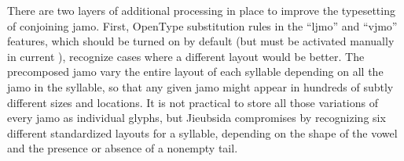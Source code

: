 \documentclass[14pt]{extarticle}
\begin{document}
There are two layers of additional processing in place to improve the
typesetting of conjoining jamo.  First, OpenType substitution rules in the
``ljmo'' and ``vjmo'' features, which should be turned on by default (but
must be activated manually in current \XeTeX), recognize cases where a
different layout would be better. The precomposed jamo vary the entire
layout of each syllable depending on all the jamo in the syllable, so that
any given jamo might appear in hundreds of subtly different sizes and
locations.  It is not practical to store all those variations of every jamo
as individual glyphs, but Jieubsida compromises by recognizing six different
standardized layouts for a syllable, depending on the shape of the vowel and
the presence or absence of a nonempty tail.

{\hspace*{\fill}\hspace*{\fill}\par}
\end{document}
